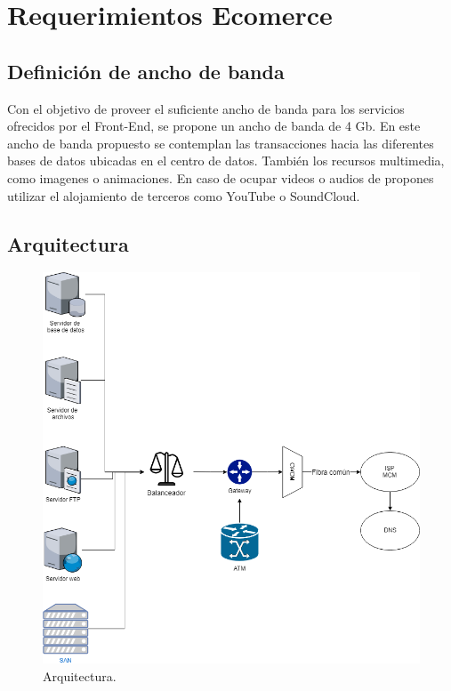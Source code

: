 \documentclass[12pt,letterpaper]{article}
\begin{document}
\newpage
\section{Requerimientos Ecomerce}
\subsection{Definición de ancho de banda}
Con el objetivo de proveer el suficiente ancho de banda para los servicios ofrecidos por 
el Front-End, se propone un ancho de banda de 4 Gb. En este ancho de banda propuesto se 
contemplan las transacciones hacia las diferentes bases de datos ubicadas en el centro de 
datos. También los recursos multimedia, como imagenes o animaciones. En caso de ocupar videos 
o audios de propones utilizar el alojamiento de terceros como YouTube o SoundCloud.

\subsection{Arquitectura}
\begin{figure}[ht]
    \centering
    \includegraphics[width=.75\textwidth]{imagenes/arqcom.png}
    \caption{Arquitectura.}
\end{figure}
\end{document}

